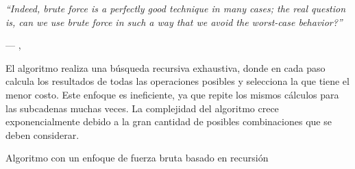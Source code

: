 \epigraph{\textit{``Indeed, brute force is a perfectly good technique in many cases; the real question is, can we use brute force in such a way that we avoid the worst-case behavior?''}}{--- \citeauthor{taocv3}, \citeyear{taocv3} \cite{taocv3}}

 El algoritmo realiza una búsqueda recursiva exhaustiva, donde en cada paso calcula los resultados de todas las operaciones posibles y selecciona la que tiene el menor costo. Este enfoque es ineficiente, ya que repite los mismos cálculos para las subcadenas muchas veces. La complejidad del algoritmo crece exponencialmente debido a la gran cantidad de posibles combinaciones que se deben considerar. \\

\begin{algorithm}[H]
    
    \DontPrintSemicolon
    \footnotesize


    \caption{Algoritmo con un enfoque de fuerza bruta basado en recursión}
    \label{alg:mi_algoritmo_1}
\end{algorithm}
\newpage
